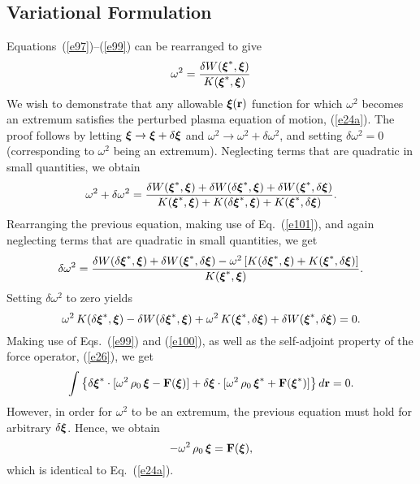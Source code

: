 \documentclass[12pt,prb,aps,notitlepage]{revtex4-1}
\newcommand{\bxi}{\mbox{\boldmath$\xi$}}
\begin{document}
\subsection{Variational Formulation}
Equations~(\ref{e97})--(\ref{e99}) can be rearranged to give
\begin{equation}\label{e101}
\omega^2 = \frac{\delta W(\bxi^\ast,\bxi)}{K(\bxi^\ast,\bxi)}
\end{equation}
We wish to demonstrate that any allowable $\bxi({\bf r})$ function for which $\omega^2$ becomes an extremum satisfies the perturbed plasma equation of motion, (\ref{e24a}). The proof follows by letting $\bxi\rightarrow \bxi + \delta\bxi$ and $\omega^2\rightarrow \omega^2+\delta\omega^2$,
and setting $\delta\omega^2=0$ (corresponding to $\omega^2$ being an extremum). 
Neglecting terms that are quadratic in small quantities, we obtain
\begin{equation}
\omega^2+\delta\omega^2= \frac{\delta W(\bxi^\ast,\bxi)+\delta W(\delta\bxi^\ast,\bxi)+\delta W(\bxi^\ast,\delta\bxi)}
{K(\bxi^\ast,\bxi)+K(\delta\bxi^\ast,\bxi)+K(\bxi^\ast,\delta\bxi)}.
\end{equation}
Rearranging the previous equation, making use of Eq.~(\ref{e101}), and again neglecting terms that are quadratic in small quantities,
we get
\begin{equation}
\delta \omega^2 = \frac{\delta W(\delta\bxi^\ast,\bxi)+\delta W(\bxi^\ast,\delta\bxi)-\omega^2\,[K(\delta\bxi^\ast,\bxi)+K(\bxi^\ast,\delta\bxi)]}
{K(\bxi^\ast,\bxi)}. 
\end{equation}
Setting $\delta\omega^2$ to zero yields
\begin{equation}
\omega^2\,K(\delta\bxi^\ast,\bxi)-\delta W(\delta\bxi^\ast,\bxi) + \omega^2\,K(\bxi^\ast,\delta\bxi) + \delta W(\bxi^\ast,\delta\bxi)=0.
\end{equation}
Making use of Eqs.~(\ref{e99}) and (\ref{e100}), as well as the self-adjoint property of the force operator, (\ref{e26}), we get
\begin{equation}
\int \left\{\delta\bxi^\ast\cdot[\omega^2\,\rho_0\,\bxi-{\bf F}(\bxi)]+ \delta\bxi\cdot[\omega^2\,\rho_0\,\bxi^\ast + {\bf F}(\bxi^\ast)]\right\}d{\bf r} = 0.
\end{equation}
However, in order for $\omega^2$ to be an extremum, the previous equation must hold for arbitrary $\delta\bxi$. Hence, 
we obtain
\begin{equation}
-\omega^2\,\rho_0\,\bxi = {\bf F}(\bxi),
\end{equation}
which is identical to Eq.~(\ref{e24a}). 
\end{document}

